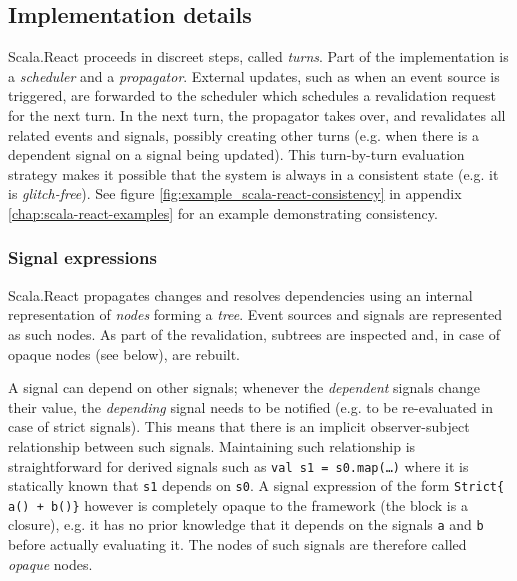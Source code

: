 \subsection{Implementation details}\label{sec:scala-react-impl}

Scala.React proceeds in discreet steps, called \emph{turns}. Part of the implementation is a \emph{scheduler} and a \emph{propagator}. External updates, such as when an event source is triggered, are forwarded to the scheduler which schedules a revalidation request for the next turn. In the next turn, the propagator takes over, and revalidates all related events and signals, possibly creating other turns (e.g. when there is a dependent signal on a signal being updated). This turn-by-turn evaluation strategy makes it possible that the system is always in a consistent state (e.g. it is \emph{glitch-free}). See figure \ref{fig:example_scala-react-consistency} in appendix \ref{chap:scala-react-examples} for an example demonstrating consistency.

\subsubsection{Signal expressions}

Scala.React propagates changes and resolves dependencies using an internal representation of \emph{nodes} forming a \emph{tree}. Event sources and signals are represented as such nodes. As part of the revalidation, subtrees are inspected and, in case of opaque nodes (see below), are rebuilt.

A signal can depend on other signals; whenever the \emph{dependent} signals change their value, the \emph{depending} signal needs to be notified (e.g. to be re-evaluated in case of strict signals). This means that there is an implicit observer-subject relationship between such signals. Maintaining such relationship is straightforward for derived signals such as \texttt{val s1 = s0.map(\dots)} where it is statically known that \texttt{s1} depends on \texttt{s0}. A signal expression of the form \texttt{Strict\{ a() + b()\}} however is completely opaque to the framework (the block is a closure), e.g. it has no prior knowledge that it depends on the signals \texttt{a} and \texttt{b} before actually evaluating it. The nodes of such signals are therefore called \emph{opaque} nodes.

